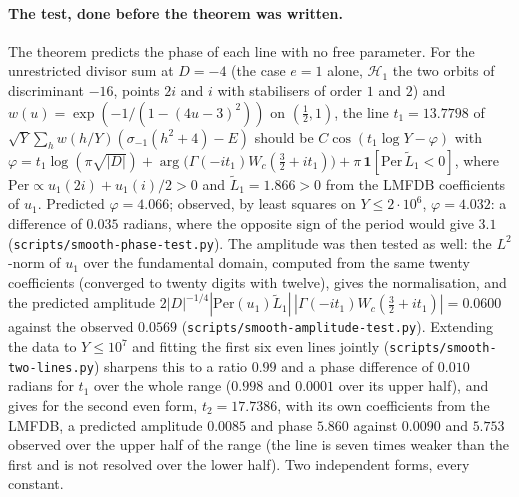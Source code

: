 \documentclass[11pt,a4paper]{article}
\theoremstyle{remark}\newtheorem{remark}[theorem]{Remark}
\begin{document}
\paragraph{The test, done before the theorem was written.} The theorem predicts the phase of each line with no free
parameter. For the unrestricted divisor sum at $D=-4$ (the case $e=1$ alone, $\mathcal H_1$ the two orbits of discriminant
$-16$, points $2i$ and $i$ with stabilisers of order $1$ and $2$) and $w(u)=\exp(-1/(1-(4u-3)^2))$ on $(\tfrac12,1)$, the
line $t_1=13.7798$ of $\sqrt Y\sum_hw(h/Y)(\sigma_{-1}(h^2+4)-E)$ should be $C\cos(t_1\log Y-\varphi)$ with
$\varphi=t_1\log(\pi\sqrt{|D|})+\arg\bigl(\Gamma(-it_1)W_c(\tfrac32+it_1)\bigr)+\pi\,\mathbf 1[\mathrm{Per}\,\tilde L_1<0]$, where
$\mathrm{Per}\propto u_1(2i)+u_1(i)/2>0$ and $\tilde L_1=1.866>0$ from the LMFDB coefficients of $u_1$. Predicted $\varphi=4.066$; observed, by
least squares on $Y\le2\cdot10^6$, $\varphi=4.032$: a difference of $0.035$ radians, where the opposite sign of the period
would give $3.1$ (\texttt{scripts/smooth-phase-test.py}). The amplitude was then tested as well: the $L^2$-norm of $u_1$ over the fundamental domain, computed from the same
twenty coefficients (converged to twenty digits with twelve), gives the normalisation, and the predicted amplitude
$2|D|^{-1/4}|\mathrm{Per}(u_1)\tilde L_1|\,|\Gamma(-it_1)W_c(\tfrac32+it_1)|=0.0600$ against the observed $0.0569$
(\texttt{scripts/smooth-amplitude-test.py}). Extending the data to $Y\le10^7$ and fitting the first six even lines
jointly (\texttt{scripts/smooth-two-lines.py}) sharpens this to a ratio $0.99$ and a phase difference of $0.010$ radians
for $t_1$ over the whole range ($0.998$ and $0.0001$ over its upper half), and gives for the second even form,
$t_2=17.7386$, with its own coefficients from the LMFDB, a predicted amplitude $0.0085$ and phase $5.860$ against
$0.0090$ and $5.753$ observed over the upper half of the range (the line is seven times weaker than the first and is
not resolved over the lower half). Two independent forms, every constant.
\end{document}
